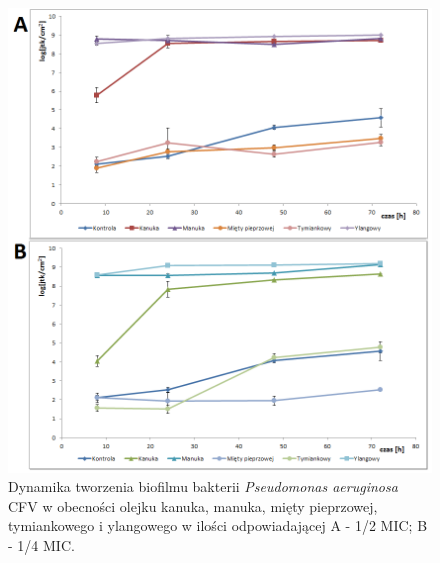 \documentclass[11pt,a4paper]{report}
\begin{document}
\begin{figure}[!h]
\begin{center}
\includegraphics[scale=0.7]{img/cfv-b.png}
\caption{Dynamika tworzenia biofilmu bakterii \textit{Pseudomonas aeruginosa} CFV w obecności olejku kanuka, manuka, mięty pieprzowej, tymiankowego i ylangowego w ilości odpowiadającej A - 1/2 MIC; B - 1/4 MIC.}\label{cfv-b}
\end{center} 
\end{figure}

\clearpage
\end{document}
